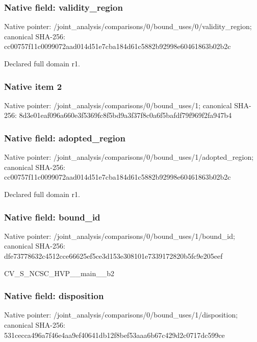 \documentclass[10pt,a4paper]{article}
\begin{document}
\subsubsection{Native field: validity\_\allowbreak{}region}
Native pointer: /joint\_\allowbreak{}analysis/comparisons/0/bound\_\allowbreak{}uses/0/validity\_\allowbreak{}region; canonical SHA-256: cc00757f11c0099072aad014d51e7cba184d61c5882b92998e60461863b02b2c

\begingroup\raggedright\sloppy Declared full domain r1.\par\endgroup

\subsubsection{Native item 2}
Native pointer: /joint\_\allowbreak{}analysis/comparisons/0/bound\_\allowbreak{}uses/1; canonical SHA-256: 8d3e01eaf096a660e3f5369fc8f5bd9a3f37f8c0a6f5bafdf79f969f2fa947b4

\subsubsection{Native field: adopted\_\allowbreak{}region}
Native pointer: /joint\_\allowbreak{}analysis/comparisons/0/bound\_\allowbreak{}uses/1/adopted\_\allowbreak{}region; canonical SHA-256: cc00757f11c0099072aad014d51e7cba184d61c5882b92998e60461863b02b2c

\begingroup\raggedright\sloppy Declared full domain r1.\par\endgroup

\subsubsection{Native field: bound\_\allowbreak{}id}
Native pointer: /joint\_\allowbreak{}analysis/comparisons/0/bound\_\allowbreak{}uses/1/bound\_\allowbreak{}id; canonical SHA-256: dfe73778632c4512cce66625ef5ce3d153e308101e7339172820b5fc9e205eef

\begingroup\raggedright\sloppy CV\_\allowbreak{}S\_\allowbreak{}NCSC\_\allowbreak{}HVP\_\allowbreak{}\_\allowbreak{}main\_\allowbreak{}\_\allowbreak{}b2\par\endgroup

\subsubsection{Native field: disposition}
Native pointer: /joint\_\allowbreak{}analysis/comparisons/0/bound\_\allowbreak{}uses/1/disposition; canonical SHA-256: 531cecca496a7f46e4aa9ef40641db12f8bef53aaa6b67c429d2c0717dc599ce
\end{document}
